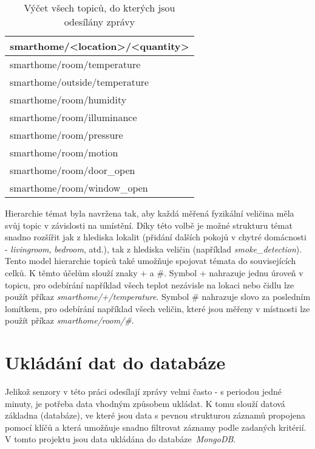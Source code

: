 \begin{table}[h]
\centering
 \begin{tabular}{|p{6cm}|} 
 \hline
  smarthome/<location>/<quantity>  \\
 \hline\hline
 smarthome/room/temperature \\ 
 smarthome/outside/temperature \\
 smarthome/room/humidity \\
 smarthome/room/illuminance \\
 smarthome/room/pressure \\
 smarthome/room/motion \\
 smarthome/room/door\_open \\
 smarthome/room/window\_open \\
 \hline
 \end{tabular}
 \caption{Výčet všech topiců, do kterých jsou odesílány zprávy}
 \label{tab:mqtt_topic_structure}
\end{table}

Hierarchie témat byla navržena tak, aby každá měřená fyzikální veličina měla svůj topic v závislosti na umístění. Díky této volbě je možné strukturu témat snadno rozšířit jak z hlediska lokalit (přidání dalších pokojů v chytré domácnosti - \textit{livingroom}, \textit{bedroom}, atd.), tak z hlediska veličin (například \textit{smoke\_detection}). Tento model hierarchie topiců také umožňuje spojovat témata do souvisejících celků. K těmto účelům slouží znaky + a \#. Symbol + nahrazuje jednu úroveň v topicu, pro odebírání například všech teplot nezávisle na lokaci nebo čidlu lze použít příkaz \textit{smarthome/+/temperature}. Symbol  \# nahrazuje slovo za posledním lomítkem, pro odebírání například všech veličin, které jsou měřeny v místnosti lze použít příkaz \mbox{\textit{smarthome/room/\#}}. 

\section{Ukládání dat do databáze} \label{sec:database}
Jelikož senzory v této práci odesílají zprávy velmi často - s periodou jedné minuty, je potřeba data vhodným způsobem ukládat. K tomu slouží datová základna (databáze), ve které jsou data s pevnou strukturou záznamů propojena pomocí klíčů a která umožňuje snadno filtrovat záznamy podle zadaných kritérií. V tomto projektu jsou data ukládána do \mbox{databáze \textit{MongoDB}}.


